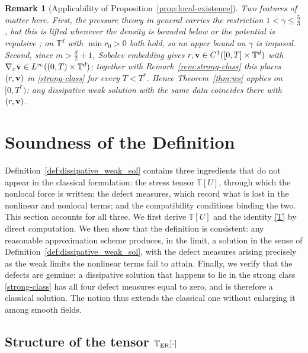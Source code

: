 \documentclass[12pt,a4paper,twoside]{article}
\newcommand{\vv}{\vc{v}}
\newcommand{\vc}[1]{{\bf #1}}
\newtheorem{rmk}{Remark}
\numberwithin{equation}{section}%
\newcommand{\T}{\mathbb{T}}
\newcommand{\Gradx}{\nabla_x}
\begin{document}
\begin{rmk}[Applicability of Proposition~\ref{prop:local-existence}]\label{rem:CJ-scope}
	Two features of \cite{CJ2022} matter here. First, the pressure theory in general carries the
	restriction $1<\gamma\le\tfrac53$, but this is lifted whenever the density is bounded below or
	the potential is repulsive \cite[Rmk.~4.3]{CJ2022}; on $\mathbb T^d$ with $\min r_0>0$ both hold,
	so no upper bound on $\gamma$ is imposed. Second, since $m>\tfrac d2+1$, Sobolev embedding gives
	$r,\vv\in C^1([0,T]\times\mathbb T^d)$ with $\Gradx\vv\in L^\infty((0,T)\times\T^d)$; together with
	Remark~\ref{rem:strong-class} this places $(r,\vv)$ in \eqref{strong-class} for every $T<T^*$.
	Hence Theorem~\ref{thm:ws} applies on $[0,T^*)$: any dissipative weak solution with the same data
	coincides there with $(r,\vv)$.
\end{rmk}
	

	


\section{Soundness of the Definition}
\label{sec:justification}

Definition~\ref{def:dissipative_weak_sol} contains three ingredients that do not appear in the classical formulation: the stress tensor $\mathbb T[U]$, through which the nonlocal force is written; the defect measures, which record what is lost in the nonlinear and nonlocal terms; and the compatibility conditions binding the two. This section accounts for all three. We first derive $\mathbb T[U]$ and the identity \eqref{T} by direct computation. We then show that the definition is consistent: any reasonable approximation scheme produces, in the limit, a solution in the sense of Definition~\ref{def:dissipative_weak_sol}, with the defect measures arising precisely as the weak limits the nonlinear terms fail to attain. Finally, we verify that the defects are genuine: a dissipative solution that happens to lie in the strong class \eqref{strong-class} has all four defect measures equal to zero, and is therefore a classical solution. The notion thus extends the classical one without enlarging it among smooth fields.

\subsection{Structure of the tensor $\mathbb{T}_{\rm ER}[\cdot ]$ }
\label{sec:stress}
\end{document}
